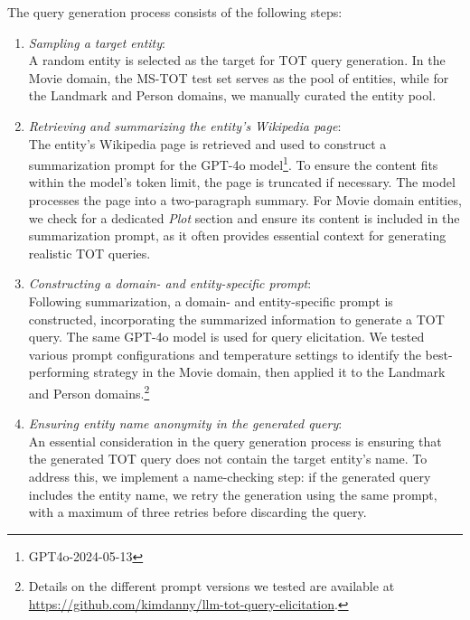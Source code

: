 The query generation process consists of the following steps:
\begin{enumerate}
\item \textit{Sampling a target entity}:\\
A random entity is selected as the target for TOT query generation. In the Movie domain, the MS-TOT test set serves as the pool of entities, while for the Landmark and Person domains, we manually curated the entity pool.

\item \textit{Retrieving and summarizing the entity’s Wikipedia page}:\\
The entity’s Wikipedia page is retrieved and used to construct a summarization prompt for the GPT-4o model\footnote{GPT4o-2024-05-13}. To ensure the content fits within the model’s token limit, the page is truncated if necessary. The model processes the page into a two-paragraph summary. For Movie domain entities, we check for a dedicated \textit{Plot} section and ensure its content is included in the summarization prompt, as it often provides essential context for generating realistic TOT queries.

\item \textit{Constructing a domain- and entity-specific prompt}:\\
Following summarization, a domain- and entity-specific prompt is constructed, incorporating the summarized information to generate a TOT query. The same GPT-4o model is used for query elicitation. 
We tested various prompt configurations and temperature settings to identify the best-performing strategy in the Movie domain, then applied it to the Landmark and Person domains.\footnote{Details on the different prompt versions we tested are available at \url{https://github.com/kimdanny/llm-tot-query-elicitation}.}


\item \textit{Ensuring entity name anonymity in the generated query}:\\
An essential consideration in the query generation process is ensuring that the generated TOT query does not contain the target entity’s name. To address this, we implement a name-checking step: if the generated query includes the entity name, we retry the generation using the same prompt, with a maximum of three retries before discarding the query.
\end{enumerate}



